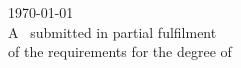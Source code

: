 \begin{titlepage}
{\large \today}\\[2cm] %

 
 A \typeofthesis\ submitted in partial fulfilment\\of the requirements for the degree of\\
\degree

\vfill %

\end{titlepage}
